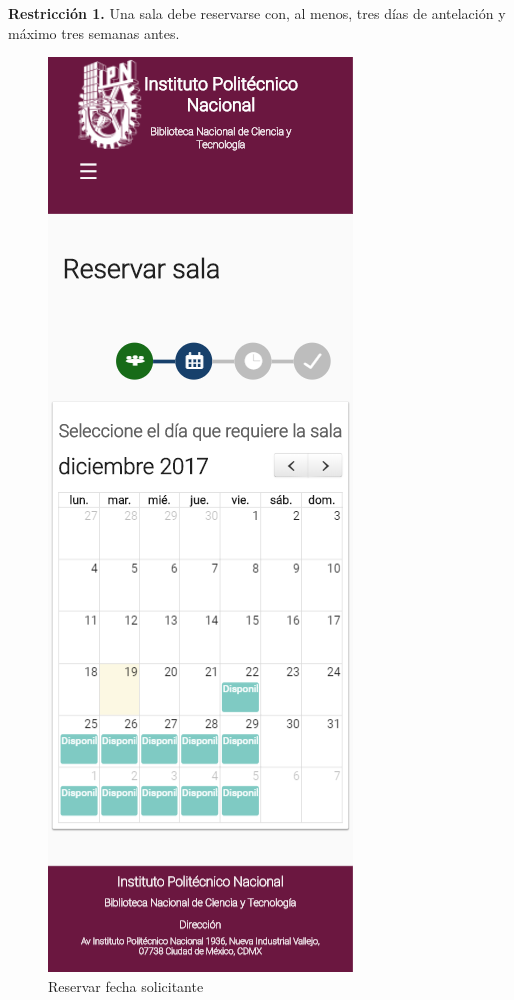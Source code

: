 \textbf{Restricción 1.} Una sala debe reservarse con, al menos, tres
	días de antelación y máximo tres semanas antes.
	\begin{figure}
	\includegraphics[scale=0.3]{images/InterfazMovil/IUGS02_reservarDiaSolicitante.png}
		\caption{Reservar fecha solicitante}
	\end{figure}
	
